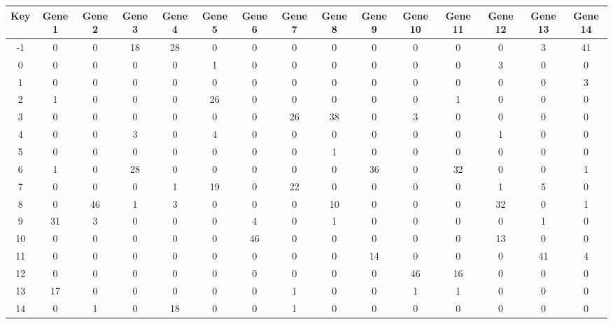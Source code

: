 \begin{tabular}{|c|c|c|c|c|c|c|c|c|c|c|c|c|c|c|}
\hline
Key & Gene 1 & Gene 2 & Gene 3 & Gene 4 & Gene 5 & Gene 6 & Gene 7 & Gene 8 & Gene 9 & Gene 10 & Gene 11 & Gene 12 & Gene 13 & Gene 14 \\
\hline
-1 & 0 & 0 & 18 & 28 & 0 & 0 & 0 & 0 & 0 & 0 & 0 & 0 & 3 & 41 \\
0 & 0 & 0 & 0 & 0 & 1 & 0 & 0 & 0 & 0 & 0 & 0 & 3 & 0 & 0 \\
1 & 0 & 0 & 0 & 0 & 0 & 0 & 0 & 0 & 0 & 0 & 0 & 0 & 0 & 3 \\
2 & 1 & 0 & 0 & 0 & 26 & 0 & 0 & 0 & 0 & 0 & 1 & 0 & 0 & 0 \\
3 & 0 & 0 & 0 & 0 & 0 & 0 & 26 & 38 & 0 & 3 & 0 & 0 & 0 & 0 \\
4 & 0 & 0 & 3 & 0 & 4 & 0 & 0 & 0 & 0 & 0 & 0 & 1 & 0 & 0 \\
5 & 0 & 0 & 0 & 0 & 0 & 0 & 0 & 1 & 0 & 0 & 0 & 0 & 0 & 0 \\
6 & 1 & 0 & 28 & 0 & 0 & 0 & 0 & 0 & 36 & 0 & 32 & 0 & 0 & 1 \\
7 & 0 & 0 & 0 & 1 & 19 & 0 & 22 & 0 & 0 & 0 & 0 & 1 & 5 & 0 \\
8 & 0 & 46 & 1 & 3 & 0 & 0 & 0 & 10 & 0 & 0 & 0 & 32 & 0 & 1 \\
9 & 31 & 3 & 0 & 0 & 0 & 4 & 0 & 1 & 0 & 0 & 0 & 0 & 1 & 0 \\
10 & 0 & 0 & 0 & 0 & 0 & 46 & 0 & 0 & 0 & 0 & 0 & 13 & 0 & 0 \\
11 & 0 & 0 & 0 & 0 & 0 & 0 & 0 & 0 & 14 & 0 & 0 & 0 & 41 & 4 \\
12 & 0 & 0 & 0 & 0 & 0 & 0 & 0 & 0 & 0 & 46 & 16 & 0 & 0 & 0 \\
13 & 17 & 0 & 0 & 0 & 0 & 0 & 1 & 0 & 0 & 1 & 1 & 0 & 0 & 0 \\
14 & 0 & 1 & 0 & 18 & 0 & 0 & 1 & 0 & 0 & 0 & 0 & 0 & 0 & 0 \\
\hline
\end{tabular}
